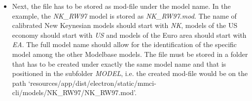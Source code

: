 \begin{itemize}
\item Next, the file has to be stored as mod-file under the model name. In the example, the \textit{NK\_RW97} model is stored as \textit{NK\_RW97.mod}. The name of calibrated New Keynesian models should start with \textit{NK}, models of the US economy should start with \textit{US} and models of the Euro area should start with \textit{EA}. The full model name should allow for the identification of the specific model among the other Modelbase models. The file must be stored in a folder that has to be created under exactly the same model name and that is positioned in the subfolder \textit{MODEL}, i.e. the created mod-file would be on the path `resources/app/dist/electron/static/mmci-cli/models/NK\_RW97/NK\_RW97.mod'.
\end{itemize}



